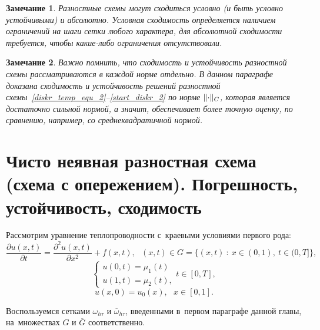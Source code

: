 \documentclass[11pt,a4paper,twoside,listtotoc,bibtotoc]{report}
\numberwithin{equation}{section}
\theoremstyle{definition}
\theoremstyle{plain}
\newtheorem{note}{Замечание}[section]
\DeclarePairedDelimiter\norm{\lVert}{\rVert}
\begin{document}
%
\begin{note}
%
    Разностные схемы могут сходиться условно (и быть условно устойчивыми) и
    абсолютно. Условная сходимость определяется наличием ограничений на шаги
    сетки любого характера, для абсолютной сходимости требуется, чтобы
    какие-либо ограничения отсутствовали.
%
\end{note}
%
\begin{note}
%
    Важно помнить, что сходимость и устойчивость разностной схемы рассматриваются
    в каждой норме отдельно. В данном параграфе доказана сходимость и
    устойчивость решений разностной схемы~\eqref{diskr_temp_equ_2}–\eqref{start_diskr_2}
    по норме $\norm{\cdot}_C$, которая
    является достаточно сильной нормой, а значит, обеспечивает более точную оценку,
    по сравнению, например, со среднеквадратичной нормой.
%
\end{note}
%


\section[Чисто неявная разностная схема]
{Чисто неявная разностная схема (схема с опережением). Погрешность, устойчивость, сходимость}
%
Рассмотрим уравнение теплопроводности с~краевыми условиями первого рода:
%
\begin{equation}
%
    \label{temp_equ_3}
    \frac{\partial u(x,t)}{\partial t} =
    \frac{\partial^2u(x,t)}{\partial x^2} + f(x,t),
    ~~~(x,t) \in G = \{(x, t)~:~x \in (0,1),~t\in (0,T]\},
%
\end{equation}
%
%
\begin{equation}
%
    \label{bord_3}
    \begin{cases}
        u(0,t) = \mu_1(t) \\
        u(1,t) = \mu_2(t),
    \end{cases}
    t\in [0,T],
%
\end{equation}
%
%
\begin{equation}
%
    \label{start_val_3}
    u(x,0) = u_0(x),~~~x\in[0,1].
%
\end{equation}

Воспользуемся сетками $\omega_{h \tau}$ и $\overline{\omega}_{h \tau}$,
введенными в~первом параграфе данной главы, на~множествах $G$ и
$\overline{G}$ соответственно.
\end{document}
